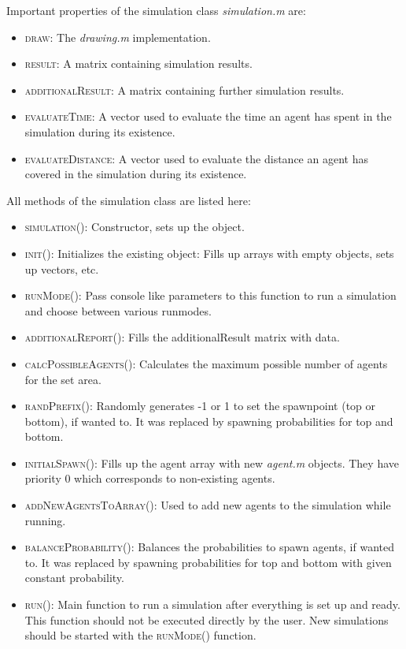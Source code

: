 \noi Important properties of the simulation class \textit{simulation.m} are:
\begin{itemize}
\item \textsc{draw}: The \textit{drawing.m} implementation.
\item \textsc{result}: A matrix containing simulation results.
\item \textsc{additionalResult}: A matrix containing further simulation results.
\item \textsc{evaluateTime}: A vector used to evaluate the time an agent has spent in the simulation during its existence. %
\item \textsc{evaluateDistance}: A vector used to evaluate the distance an agent has covered in the simulation during its existence. %
\end{itemize}

\noi All methods of the simulation class are listed here:
\begin{itemize}
\item \textsc{simulation()}: Constructor, sets up the object.
\item \textsc{init()}: Initializes the existing object: Fills up arrays with empty objects, sets up vectors, etc.
\item \textsc{runMode()}: Pass console like parameters to this function to run a simulation and choose between various runmodes.
\item \textsc{additionalReport()}: Fills the additionalResult matrix with data.
\item \textsc{calcPossibleAgents()}: Calculates the maximum possible number of agents for the set area. 
\item \textsc{randPrefix()}: Randomly generates -1 or 1 to set the spawnpoint (top or bottom), if wanted to. It was replaced by spawning probabilities for top and bottom.
\item \textsc{initialSpawn()}: Fills up the agent array with new \textit{agent.m} objects. They have priority 0 which corresponds to non-existing agents.
\item \textsc{addNewAgentsToArray()}: Used to add new agents to the simulation while running.
\item \textsc{balanceProbability()}: Balances the probabilities to spawn agents, if wanted to. It was replaced by spawning probabilities for top and bottom with given constant probability.
\item \textsc{run()}: Main function to run a simulation after everything is set up and ready. This function should not be executed directly by the user. New simulations should be started with the \textsc{runMode()} function.
\end{itemize}


